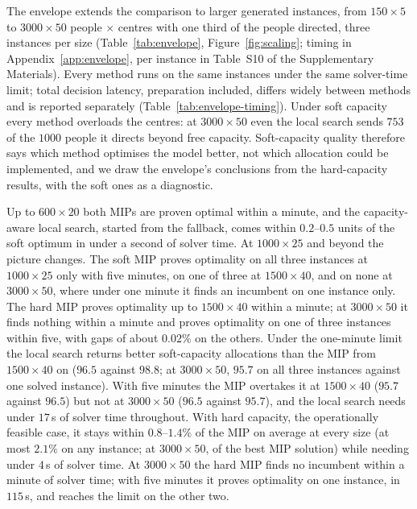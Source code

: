 \documentclass[systems,article,submit,moreauthors,pdftex]{Definitions/mdpi}
\begin{document}
The envelope extends the comparison to larger generated instances, from $150\times5$ to
$3000\times50$ people $\times$ centres with one third of the people directed, three instances per
size (Table~\ref{tab:envelope}, Figure~\ref{fig:scaling}; timing in Appendix~\ref{app:envelope},
per instance in Table~S10 of the Supplementary Materials). Every method runs on the same instances
under the same solver-time limit; total decision latency, preparation included, differs widely
between methods and is reported separately (Table~\ref{tab:envelope-timing}). Under soft capacity
every method overloads the centres: at $3000\times50$ even the local search sends $753$ of the
$1000$ people it directs beyond free capacity. Soft-capacity quality therefore says which method
optimises the model better, not which allocation could be implemented, and we draw the
envelope's conclusions from the hard-capacity results, with the soft ones as a diagnostic.



Up to $600\times20$ both MIPs are proven optimal within a minute, and the capacity-aware local
search, started from the fallback, comes within $0.2$--$0.5$ units of the soft optimum in under a
second of solver time. At $1000\times25$ and beyond the picture changes. The soft MIP proves
optimality on all three instances at $1000\times25$ only with five minutes, on one of three at
$1500\times40$, and on none at $3000\times50$, where under one minute it finds an incumbent on
one instance only. The hard MIP proves optimality up to $1500\times40$ within a minute; at
$3000\times50$ it finds nothing within a minute and proves optimality on one of three instances
within five, with gaps of about $0.02\%$ on the others. Under the one-minute limit the local
search returns better soft-capacity allocations than the MIP from $1500\times40$ on ($96.5$
against $98.8$; at $3000\times50$, $95.7$ on all three instances against one solved instance).
With five minutes the MIP overtakes it at $1500\times40$ ($95.7$ against $96.5$) but not at
$3000\times50$ ($96.5$ against $95.7$), and the local search needs under $17$\,s of solver time
throughout. With hard capacity, the operationally feasible case, it stays within $0.8$--$1.4\%$
of the MIP on average at every size (at most $2.1\%$ on any instance; at $3000\times50$, of the
best MIP solution) while needing under $4$\,s of solver time. At $3000\times50$
the hard MIP finds no incumbent within a minute of solver time; with five minutes it proves
optimality on one instance, in $115$\,s, and reaches the limit on the other two.
\end{document}
